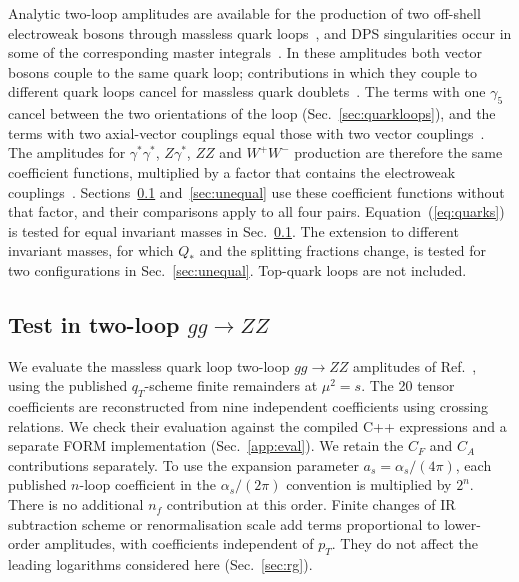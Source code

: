 \documentclass[%
 onecolumn,
 superscriptaddress,
 preprintnumbers,
 nofootinbib,
 amsmath,amssymb,
 aps,
 prl,
]{revtex4-2}
\begin{document}
Analytic two-loop amplitudes are available for the
production of two off-shell electroweak bosons through
massless quark loops~\cite{vonManteuffel:2015msa,Caola:2015ila},
and DPS singularities occur in some of the
corresponding master integrals~\cite{Henn:2014lfa}.
In these amplitudes both vector bosons couple to the
same quark loop; contributions in which they couple to
different quark loops cancel for massless quark
doublets~\cite{vonManteuffel:2015msa}. The terms with
one $\gamma_5$ cancel between the two orientations of
the loop (Sec.~\ref{sec:quarkloops}), and the terms with
two axial-vector couplings equal those with two vector
couplings~\cite{vonManteuffel:2015msa}.
The amplitudes for $\gamma^*\gamma^*$, $Z\gamma^*$,
$ZZ$ and $W^+W^-$ production are therefore the same
coefficient functions, multiplied by a factor that
contains the electroweak
couplings~\cite{vonManteuffel:2015msa}.
Sections~\ref{sec:zz} and~\ref{sec:unequal} use these
coefficient functions without that factor, and their
comparisons apply to all four pairs.
Equation~(\ref{eq:quarks}) is tested for equal
invariant masses in Sec.~\ref{sec:zz}. The extension to
different invariant masses, for which
$Q_*$ and the splitting fractions change,
is tested for two configurations in
Sec.~\ref{sec:unequal}. Top-quark loops are not included.

\subsection{Test in two-loop \texorpdfstring{$gg\to ZZ$}{gg -> ZZ}}
\label{sec:zz}

We evaluate the massless quark loop two-loop
$gg\to ZZ$ amplitudes of
Ref.~\cite{vonManteuffel:2015msa}, using
the published $q_T$-scheme finite remainders
at $\mu^2=s$. The 20 tensor coefficients
are reconstructed from nine independent
coefficients using crossing relations.
We check their evaluation against the
compiled C++ expressions and a separate
FORM implementation (Sec.~\ref{app:eval}).
%
We retain the $C_F$ and $C_A$ contributions
separately. To use the expansion parameter
$a_s=\alpha_s/(4\pi)$, each published
$n$-loop coefficient in the
$\alpha_s/(2\pi)$ convention is multiplied
by $2^n$. There is no additional $n_f$
contribution at this order.
Finite changes of IR subtraction
scheme or renormalisation scale add terms
proportional to lower-order amplitudes,
with coefficients independent of $p_T$.
They do not affect the leading logarithms
considered here (Sec.~\ref{sec:rg}).
\end{document}
